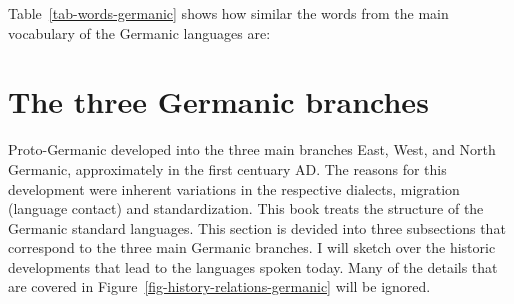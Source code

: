 Table~\vref{tab-words-germanic} shows how similar the words from the main vocabulary of the Germanic
languages are:
\begin{table}
\caption{\label{tab-words-germanic}Words from the main vocabulary of some Germanic languages}
\end{table}






\section{The three Germanic branches}

Proto-Germanic developed into the three main branches East, West, and North Germanic, approximately in
the first centuary AD. The reasons for this development were inherent variations in the respective
dialects, migration (language contact) and standardization. This book treats the structure of the
Germanic standard languages. This section is devided into three subsections that correspond to the
three main Germanic branches. I will sketch over the historic developments that lead to the
languages spoken today. Many of the details that are covered in Figure~\ref{fig-history-relations-germanic} will be ignored.



